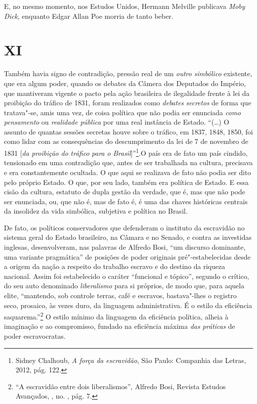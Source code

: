 E, no mesmo momento, nos Estudos Unidos, Hermann Melville publicava
\emph{Moby Dick}, enquanto Edgar Allan Poe morria de tanto beber.

\section{XI}

Também havia signo de contradição, pressão real de um \emph{outro
simbólico} existente, que era algum poder, quando os debates da Câmera
dos Deputados do Império, que mantiveram vigente o pacto pela ação
brasileira de ilegalidade frente à lei da proibição do tráfico de 1831,
foram realizados como \emph{debates} \emph{secretos} de forma que
tratava"-se, amis uma vez, de coisa política que não podia ser enunciada
\emph{como pensamento} ou \emph{realidade pública} por uma real
instância de Estado. ``(\ldots{}) O assunto de quantas sessões secretas houve
sobre o tráfico, em 1837, 1848, 1850, foi como lidar com as
consequências do descumprimento da lei de 7 de novembro de 1831
{[}\emph{da proibição do tráfico para o Brasil}{]}''\footnote{Sidney
  Chalhoub, \emph{A força da escravidão}, São Paulo: Companhia das
  Letras, 2012, pág. 122.}.O país era de fato um país cindido,
tensionado em uma contradição que, antes de ser trabalhada na cultura,
precisava e era constantemente ocultada. O que aqui se realizava de fato
não podia ser dito pelo próprio Estado. O que, por seu lado, também era
política de Estado. E essa cisão da cultura, estatuto de dupla gestão da
verdade, que é, mas que não pode ser enunciada, ou, que não é, mas de
fato é, é uma das chaves históricas centrais da insolidez da vida
simbólica, subjetiva e política no Brasil.

De fato, os políticos conservadores que defenderam o instituto da
escravidão no sistema geral do Estado brasileiro, na Câmara e no Senado,
e contra as investidas inglesas, desenvolveram, nas palavras de Alfredo
Bosi, ``um discurso dominante, uma variante pragmática'' de posições de
poder originais pré"-estabelecidas desde a origem da nação a respeito do
trabalho escravo e do destino da riqueza nacional. Assim foi
estabelecido o caráter ``funcional e tópico'', segundo o crítico, do seu
auto denominado \emph{liberalismo} para si próprios, de modo que, para
aquela elite, ``mantendo, sob controle terras, café e escravos,
bastava"-lhes o registro seco, prosaico, às vezes duro, da linguagem
administrativa. É o estilo da eficiência saquarema.''\footnote{``A
  escravidão entre dois liberalismos'', Alfredo Bosi, Revista Estudos
  Avançados, , no. , pág. 7.} O estilo mínimo da linguagem da
eficiência política, alheia à imaginação e ao compromisso, fundado na
eficiência máxima \emph{das práticas} de poder escravocratas.

